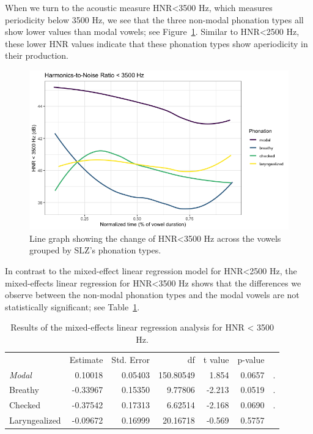 \documentclass[12pt, letterpaper]{article}
\providecommand{\lsptoprule}{\midrule\toprule}
\providecommand{\lspbottomrule}{\bottomrule\midrule}
\begin{document}
When we turn to the acoustic measure HNR<3500 Hz, which measures periodicity below 3500 Hz, we see that the three non-modal phonation types all show lower values than modal vowels; see Figure~\ref*{fig:HNR35}. Similar to HNR<2500 Hz, these lower HNR values indicate that these phonation types show aperiodicity in their production. 
\begin{figure}[!h]
	\centering
	\includegraphics[width=.75\linewidth]{Images/HNR35.png}
	\caption{Line graph showing the change of HNR\textless 3500 Hz across the vowels grouped by SLZ's phonation types.}
	\label{fig:HNR35}
\end{figure}

In contrast to the mixed-effect linear regression model for HNR<2500 Hz, the mixed-effects linear regression for HNR\textless 3500 Hz shows that the differences we observe between the non-modal phonation types and the modal vowels are not statistically significant; see Table~\ref*{tab:HNR35}. 
\begin{table}[!h]
    \centering
    \caption{Results of the mixed-effects linear regression analysis for HNR < 3500 Hz.}
    \label{tab:HNR35}
    \begin{tabular}{lrrrrrl}
	\lsptoprule
					&  Estimate  & Std. Error & df & t value & p-value & \\
        \textit{Modal}  &   0.10018  &  0.05403 & 150.80549 &  1.854 &  0.0657 & . \\  
  	Breathy   		&  -0.33967  &  0.15350 &  9.77806  &-2.213 &  0.0519 & . \\
	Checked    		&  -0.37542  &  0.17313 &  6.62514  &-2.168 &  0.0690 & . \\
	Laryngealized	&  -0.09672  &  0.16999 & 20.16718  &-0.569 &  0.5757 & \\
    \lspbottomrule
    \end{tabular}
\end{table}
\end{document}
